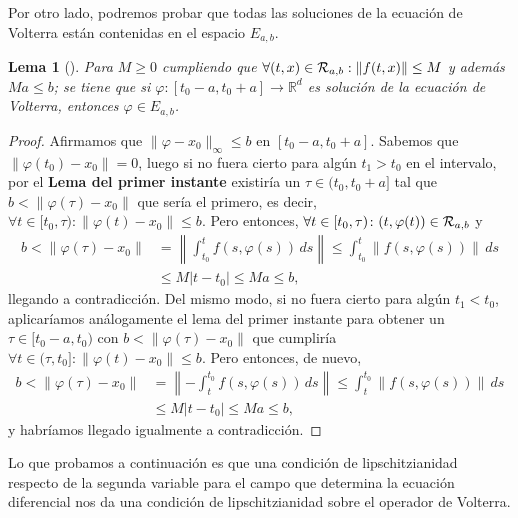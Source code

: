 \documentclass[11pt]{article}
\theoremstyle{plain}
\newtheorem{lemma}{Lema}
\theoremstyle{definition}
\theoremstyle{remark}
\begin{document}
Por otro lado, podremos probar que todas las soluciones de la ecuación
de Volterra están contenidas en el espacio $E_{a,b}$.

\begin{lemma}[]\label{lema-2-contr}
  Para \(M \geq 0\) cumpliendo que \(\forall (t,x)\in {\cal R}_{a,b} : \|f(t,x)\| \leq M\) y además
  \(Ma \leq b\); se tiene que si \(\varphi \colon [t_0-a,t_0+a] \to \mathbb{R}^d\) es solución
  de la ecuación de Volterra, entonces \(\varphi \in E_{a,b}\).
\end{lemma}
\begin{proof}
  Afirmamos que $\|\varphi-x_0\|_{\infty} \leq b$ en $[t_0-a,t_0+a]$. Sabemos que $\|\varphi(t_0) - x_0\| = 0$, luego
  si no fuera cierto para algún $t_1 > t_0$ en el intervalo, por el \textbf{Lema del primer instante}
  existiría un $\tau \in (t_0,t_0+a]$ tal que $b<\|\varphi(\tau) - x_0\|$ que sería el primero,
  es decir, $\forall t \in [t_0,\tau)\colon \|\varphi(t)-x_0\| \leq b$. Pero entonces, $\forall t \in [t_0,\tau)\colon (t,\varphi(t)) \in {\cal R}_{a,b}$ y
  \[\begin{aligned}
   b < \|\varphi(\tau)-x_0\| &=
   \left\| \int_{t_0}^t f(s,\varphi(s))\,ds \right\| \leq
   \int_{t_0}^t \left\| f(s,\varphi(s)) \right\|\,ds \\&\leq
   M|t-t_0| \leq
   Ma \leq b,
 \end{aligned}\]
  llegando a contradicción. Del mismo modo, si no fuera cierto para algún $t_1 < t_0$,
  aplicaríamos análogamente el lema del primer instante para obtener un $\tau \in [t_0-a,t_0)$
  con $b < \| \varphi(\tau) - x_0 \|$ que cumpliría $\forall t \in (\tau,t_0]\colon \|\varphi(t)-x_0\| \leq b$. Pero entonces, de
  nuevo,  
  \[\begin{aligned}
   b < \|\varphi(\tau)-x_0\| &=
   \left\| -\int_{t}^{t_0} f(s,\varphi(s))\,ds \right\| \leq
   \int^{t_0}_t \left\| f(s,\varphi(s)) \right\|\,ds \\&\leq
   M|t-t_0| \leq
   Ma \leq b,
 \end{aligned}\]
  y habríamos llegado igualmente a contradicción.
\end{proof}

Lo que probamos a continuación es que una condición de lipschitzianidad respecto
de la segunda variable para el campo que determina la ecuación diferencial nos
da una condición de lipschitzianidad sobre el operador de Volterra.
\end{document}
